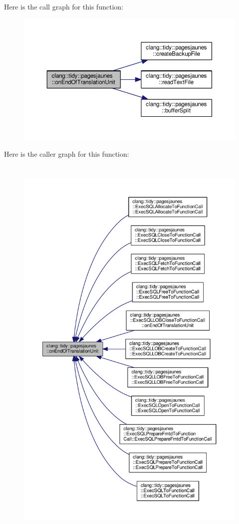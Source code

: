 Here is the call graph for this function\+:
\nopagebreak
\begin{figure}[H]
\begin{center}
\leavevmode
\includegraphics[width=350pt]{namespaceclang_1_1tidy_1_1pagesjaunes_ac8e5dd22a5698742b52fd8207096a3de_cgraph}
\end{center}
\end{figure}
Here is the caller graph for this function\+:
\nopagebreak
\begin{figure}[H]
\begin{center}
\leavevmode
\includegraphics[height=550pt]{namespaceclang_1_1tidy_1_1pagesjaunes_ac8e5dd22a5698742b52fd8207096a3de_icgraph}
\end{center}
\end{figure}
